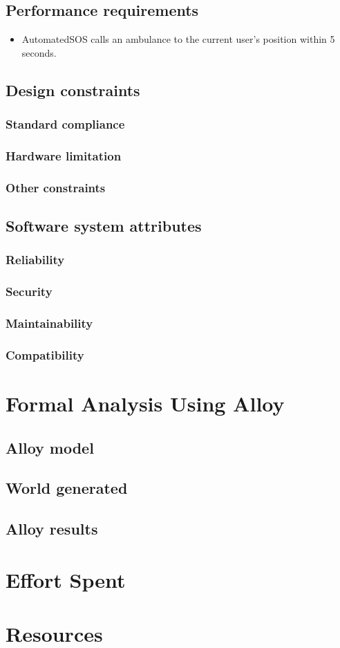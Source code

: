 \documentclass{article}
\begin{document}
\subsection{Performance requirements}
\begin{itemize}
	\item AutomatedSOS calls an ambulance to the current user's position within 5 seconds.
\end{itemize}
\subsection{Design constraints}
\subsubsection{Standard compliance}
\subsubsection{Hardware limitation}
\subsubsection{Other constraints}
\subsection{Software system attributes}
\subsubsection{Reliability}
\subsubsection{Security}
\subsubsection{Maintainability}
\subsubsection{Compatibility}
\section{Formal Analysis Using Alloy}
\subsection{Alloy model}
\subsection{World generated}
\subsection{Alloy results}
\section{Effort Spent}
\section{Resources}
\end{document}
